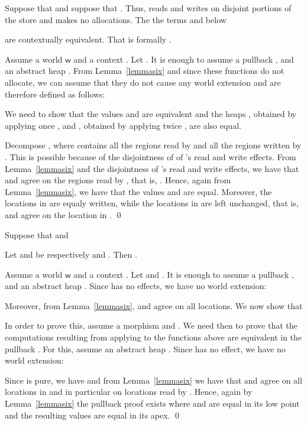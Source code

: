 \documentclass[orivec]{llncs}
\renewenvironment{proof}{\vspace{-1mm} \noindent {\bf Proof}\quad}{\qed}
\newcommand\w{\ensuremath{\mathsf{w}}\xspace}
\begin{document}
\begin{proposition}\label{dupl}
  Suppose that  and suppose
that
  . Thus, 
  reads and writes on disjoint portions of the store and makes no
  allocations. The the terms   and  below

 are contextually equivalent. That is
formally .
\end{proposition}

\begin{proof}
Assume a world \w and a context .
Let . 
It is enough to assume a pullback 
, and an abstract heap . 
From Lemma~\ref{lemmasix} and since these functions do not allocate, we
can assume that they do not cause any world extension and are therefore
defined as follows:

We need to show that the values  and  are equivalent and 
the heaps , obtained by applying once , and ,
obtained by applying twice , are also equal. 

Decompose , where  contains all
the regions read by  and  all the regions written by . This is
possible because of the disjointness of of 's read and write effects. 
From Lemma~\ref{lemmasix} and the disjointness of  's read and write
effects, we have that  and  agree on the regions read
by , that is, . Hence, again
from Lemma~\ref{lemmasix}, we have that the values  and 
are equal. Moreover, the locations in  are equaly written, while the
locations in  are left unchanged, that is,
 and  agree on the location in .
\end{proof}

\begin{proposition}\label{hoist}
Suppose that  and 

Let  and  be respectively  and
. 
Then .
\end{proposition}


\begin{proof}
Assume a world \w and a context .
Let  and 
. 
It is enough to assume a pullback 
, and an abstract heap . Since  has no effects, we have no world extension:

Moreover, from Lemma~\ref{lemmasix},  and  agree on
all locations. We now show that 

In order to prove this, assume a morphism  and . We need then to prove that the computations resulting from 
applying  to the functions above are equivalent in the pullback
. For this, assume an abstract heap . Since  has no effect, we have no world extension:

Since  is pure, we have  and from
Lemma~\ref{lemmasix} we have that  and  agree on all
locations in  and in particular on locations read by . Hence, 
again by Lemma~\ref{lemmasix} the pullback proof exists where 
and 
 are equal in its low point and the resulting values are equal
in its apex.
\end{proof}
\end{document}
